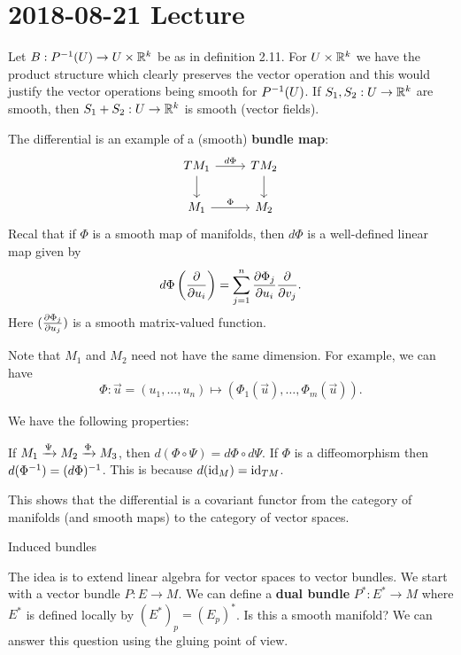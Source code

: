 \section{2018-08-21 Lecture}

\begin{rmk}
  Let $B: P^{-1}(U) \to U \times \mathbb{R}^k$ be as in definition 2.11.
  For $U \times \mathbb{R}^k$ we have the product structure which clearly preserves the vector operation and this would justify the vector operations being smooth for $P^{-1}(U)$.
  If $S_1, S_2: U \to \mathbb{R}^k$ are smooth, then $S_1+S_2: U \to \mathbb{R}^k$ is smooth (vector fields).
\end{rmk}

\begin{exam}
  The differential is an example of a (smooth) \textbf{bundle map}:
  \begin{equation*}
    \begin{tikzcd}
      TM_1 \ar[d] \ar[r, "d\Phi"] & TM_2 \ar[d] \\
      M_1 \ar[r, "\Phi"] & M_2
    \end{tikzcd}
  \end{equation*}
  Recal that if $\Phi$ is a smooth map of manifolds, then $d\Phi$ is a well-defined linear map given by
  \[ d\Phi \left( \frac{\partial}{\partial u_i} \right) = \sum_{j=1}^n \frac{\partial \Phi_j}{\partial u_i} \frac{\partial}{\partial v_j}. \]
  Here $( \tfrac{\partial\Phi_j}{\partial u_j})$ is a smooth matrix-valued function.

  Note that $M_1$ and $M_2$ need not have the same dimension.
  For example, we can have
  \[ \Phi: \vec u = (u_1,\ldots,u_n) \mapsto (\Phi_1(\vec u),\ldots,\Phi_m(\vec u)). \]

  We have the following properties:
  \begin{itm}
    \io If $M_1 \xrightarrow{\Psi} M_2 \xrightarrow{\Phi} M_3$, then $d(\Phi\circ\Psi)=d\Phi\circ d\Psi$.
    \io If $\Phi$ is a diffeomorphism then $d(\Phi^{-1})=(d\Phi)^{-1}$.
    This is because $d(\operatorname{id}_M)=\operatorname{id}_{TM}$.
  \end{itm}

  This shows that the differential is a covariant functor from the category of manifolds (and smooth maps) to the category of vector spaces.
\end{exam}

Induced bundles

The idea is to extend linear algebra for vector spaces to vector bundles.
We start with a vector bundle $P: E \to M$.
We can define a \textbf{dual bundle} $P^*: E^* \to M$ where $E^*$ is defined locally by $(E^*)_p=(E_p)^*$.
Is this a smooth manifold?
We can answer this question using the gluing point of view.

